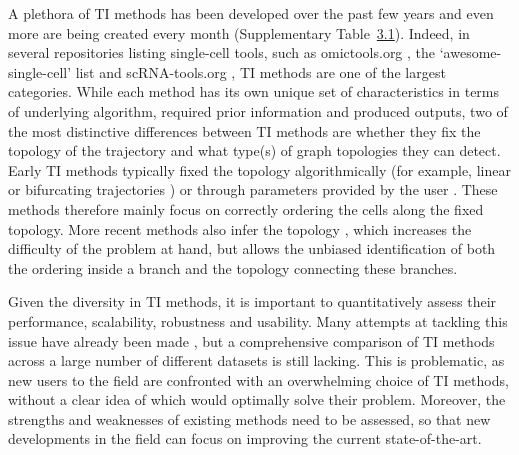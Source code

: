 A plethora of TI methods has been developed over the past few years and even more are being created every month (Supplementary Table~\hyperref[tab:supptable_1]{3.1}). Indeed, in several repositories listing single-cell tools, such as omictools.org \cite{henry_omictoolsinformativedirectory_2014}, the ‘awesome-single-cell’ list \cite{davis_awesomesinglecell_2018} and scRNA-tools.org \cite{zappia_exploringsinglecellrnaseq_2017}, TI methods are one of the largest categories. While each method has its own unique set of characteristics in terms of underlying algorithm, required prior information and produced outputs, two of the most distinctive differences between TI methods are whether they fix the topology of the trajectory and what type(s) of graph topologies they can detect. Early TI methods typically fixed the topology algorithmically (for example, linear \cite{bendall_singlecelltrajectorydetection_2014,schlitzer_identificationcdc1cdc2committed_2015,shin_singlecellrnaseqwaterfall_2015,campbell_bayesiangaussianprocess_2015} or bifurcating trajectories \cite{haghverdi_diffusionpseudotimerobustly_2016,setty_wishboneidentifiesbifurcating_2016}) or through parameters provided by the user \cite{trapnell_dynamicsregulatorscell_2014,matsumoto_scoupprobabilisticmodel_2016}. These methods therefore mainly focus on correctly ordering the cells along the fixed topology. More recent methods also infer the topology \cite{qiu_reversedgraphembedding_2017,street_slingshotcelllineage_2018,wolf_graphabstractionreconciles_2017}, which increases the difficulty of the problem at hand, but allows the unbiased identification of both the ordering inside a branch and the topology connecting these branches.

Given the diversity in TI methods, it is important to quantitatively assess their performance, scalability, robustness and usability. Many attempts at tackling this issue have already been made \cite{haghverdi_diffusionpseudotimerobustly_2016,ji_tscanpseudotimereconstruction_2016,welch_slicerinferringbranched_2016,matsumoto_scoupprobabilisticmodel_2016,duverle_celltreebioconductorpackage_2016,cannoodt_computationalmethodstrajectory_2016,lonnberg_singlecellrnaseqcomputational_2017,campbell_probabilisticmodelingbifurcations_2017,wolf_graphabstractionreconciles_2017}, but a comprehensive comparison of TI methods across a large number of different datasets is still lacking. This is problematic, as new users to the field are confronted with an overwhelming choice of TI methods, without a clear idea of which would optimally solve their problem. Moreover, the strengths and weaknesses of existing methods need to be assessed, so that new developments in the field can focus on improving the current state-of-the-art.

